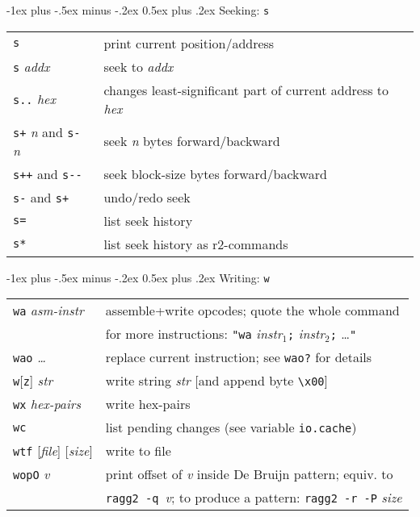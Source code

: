 \documentclass[a4paper,landscape]{article}
\makeatletter
\renewcommand{\section}{\@startsection{section}{1}{0mm}%
                                {-1ex plus -.5ex minus -.2ex}%
                                {0.5ex plus .2ex}%
                                {\normalfont\large\bfseries}}
\makeatother
\begin{document}
\begin{multicols*}{3}
\section{Seeking: \texttt{s}}
\begin{tabular}{@{}ll@{}}
\texttt{s} & print current position/address \\
\texttt{s} \textit{addx} & seek to \textit{addx} \\
\texttt{s..} \textit{hex} & changes least-significant part of current address to \textit{hex}\\
\texttt{s+} \textit{n} and \texttt{s-} \textit{n} & seek \textit{n} bytes forward/backward \\
\texttt{s++} and \texttt{s-{}-} & seek block-size bytes forward/backward \\
\texttt{s-} and \texttt{s+} & undo/redo seek \\
\texttt{s=} & list seek history \\
\texttt{s*} & list seek history as r2-commands \\
\end{tabular}

\section{Writing: \texttt{w}}
\begin{tabular}{@{}ll@{}}
\texttt{wa} \textit{asm-instr} & assemble+write opcodes;
	quote the whole command \\ &  for more instructions:
\texttt{"wa} \textit{instr$_1$}\texttt{;} \textit{instr$_2$}\texttt{;} \ldots\texttt{"} \\
\texttt{wao} \textit{\ldots} & replace current instruction; see \texttt{wao?} for details \\
\texttt{w}[\texttt{z}] \textit{str} & write string \textit{str} [and append byte \texttt{\textbackslash x00}] \\
\texttt{wx} \textit{hex-pairs} & write hex-pairs \\
\texttt{wc} & list pending changes (see variable \texttt{io.cache}) \\
\texttt{wtf} [\textit{file}] [\textit{size}] & write to file \\
\texttt{wopO} \textit{v} & print offset of \textit{v} inside De Bruijn pattern; equiv. to\\
	& \texttt{ragg2 -q }\textit{v}; to produce a pattern: \texttt{ragg2 -r -P} \textit{size} \\
\end{tabular}


\end{multicols*}
\end{document}
